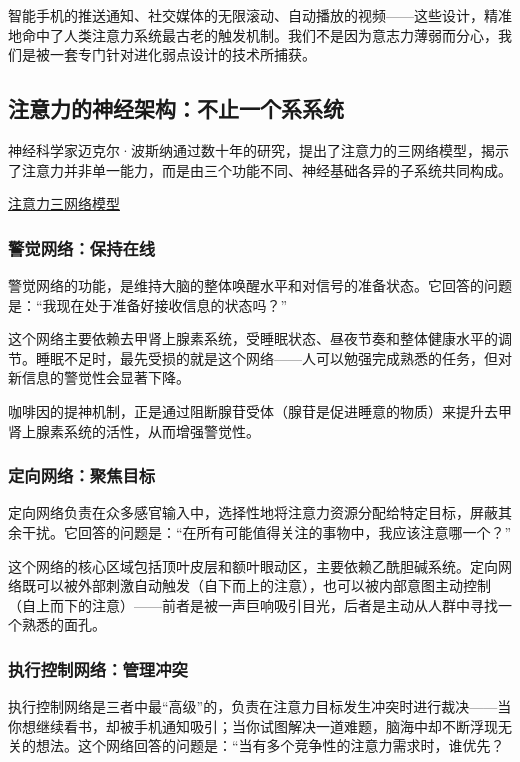\documentclass[11pt]{article}
\begin{document}
智能手机的推送通知、社交媒体的无限滚动、自动播放的视频——这些设计，精准地命中了人类注意力系统最古老的触发机制。我们不是因为意志力薄弱而分心，我们是被一套专门针对进化弱点设计的技术所捕获。
\subsection{注意力的神经架构：不止一个系系统}
\label{sec:org4689b81}

神经科学家迈克尔·波斯纳通过数十年的研究，提出了注意力的三网络模型，揭示了注意力并非单一能力，而是由三个功能不同、神经基础各异的子系统共同构成。

\href{file:///c:/Users/fupen/org/book/插图/注意力三网络模型.png}{注意力三网络模型}
\subsubsection{警觉网络：保持在线}
\label{sec:orgc13861f}

警觉网络的功能，是维持大脑的整体唤醒水平和对信号的准备状态。它回答的问题是：“我现在处于准备好接收信息的状态吗？”

这个网络主要依赖去甲肾上腺素系统，受睡眠状态、昼夜节奏和整体健康水平的调节。睡眠不足时，最先受损的就是这个网络——人可以勉强完成熟悉的任务，但对新信息的警觉性会显著下降。

咖啡因的提神机制，正是通过阻断腺苷受体（腺苷是促进睡意的物质）来提升去甲肾上腺素系统的活性，从而增强警觉性。
\subsubsection{定向网络：聚焦目标}
\label{sec:org08f657c}

定向网络负责在众多感官输入中，选择性地将注意力资源分配给特定目标，屏蔽其余干扰。它回答的问题是：“在所有可能值得关注的事物中，我应该注意哪一个？”

这个网络的核心区域包括顶叶皮层和额叶眼动区，主要依赖乙酰胆碱系统。定向网络既可以被外部刺激自动触发（自下而上的注意），也可以被内部意图主动控制（自上而下的注意）——前者是被一声巨响吸引目光，后者是主动从人群中寻找一个熟悉的面孔。
\subsubsection{执行控制网络：管理冲突}
\label{sec:org30818e8}

执行控制网络是三者中最“高级”的，负责在注意力目标发生冲突时进行裁决——当你想继续看书，却被手机通知吸引；当你试图解决一道难题，脑海中却不断浮现无关的想法。这个网络回答的问题是：“当有多个竞争性的注意力需求时，谁优先？
\end{document}
